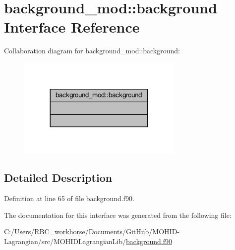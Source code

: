 \hypertarget{interfacebackground__mod_1_1background}{}\section{background\+\_\+mod\+:\+:background Interface Reference}
\label{interfacebackground__mod_1_1background}


Collaboration diagram for background\+\_\+mod\+:\+:background\+:\nopagebreak
\begin{figure}[H]
\begin{center}
\leavevmode
\includegraphics[width=227pt]{interfacebackground__mod_1_1background__coll__graph}
\end{center}
\end{figure}


\subsection{Detailed Description}


Definition at line 65 of file background.\+f90.



The documentation for this interface was generated from the following file\+:\begin{DoxyCompactItemize}
\item 
C\+:/\+Users/\+R\+B\+C\+\_\+workhorse/\+Documents/\+Git\+Hub/\+M\+O\+H\+I\+D-\/\+Lagrangian/src/\+M\+O\+H\+I\+D\+Lagrangian\+Lib/\mbox{\hyperlink{background_8f90}{background.\+f90}}\end{DoxyCompactItemize}
